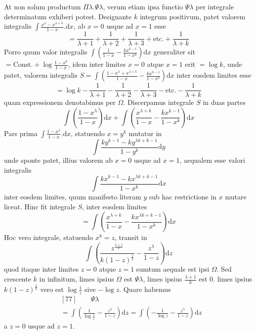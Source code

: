 At non solum productum $\Pi\lambda.\Psi\lambda$, verum etiam ipsa functio $\Psi\lambda$ per integrale determinatum exhiberi potest. Designante $k$ integrum positivum, patet valorem integralis $\int\frac{x^\lambda-x^{\lambda+k}}{1-x}.\mathrm{d}x$, ab $x=0$ usque ad $x=1$ esse
\[
=\frac{1}{\lambda+1}+\frac{1}{\lambda+2}+\frac{1}{\lambda+3}+\text{etc.}+\frac{1}{\lambda+k}
\]
Porro quum valor integralis $\int\left(\frac{1}{1-x}-\frac{kx^{k-1}}{1-x^k}\right)\mathrm{d}x$ generaliter sit $=\mathrm{Const.}+\log\frac{1-x^k}{1-x}$, idem inter limites $x=0$ atque $x=1$ erit $=\log k$, unde patet, valorem integralis $S=\int\left(\frac{1-x^\lambda+x^{\lambda+k}}{1-x}-\frac{kx^{k-1}}{1-x^k}\right)\mathrm{d}x$ inter eosdem limites esse
\[
=\log k-\frac{1}{\lambda+1}-\frac{1}{\lambda+2}-\frac{1}{\lambda+3}-\text{etc.}-\frac{1}{\lambda+k}
\]
quam expressionem denotabimus per $\Omega$. Discerpamus integrale $S$ in duas partes
\[
\int\left(\frac{1-x^\lambda}{1-x}\right)\mathrm{d}x+\int\left(\frac{x^{\lambda+k}}{1-x}-\frac{kx^{k-1}}{1-x^k}\right)\mathrm{d}x
\]
Pars prima $\int\frac{1-x^\lambda}{1-x}.\mathrm{d}x$, statuendo $x=y^k$ mutatur in
\[
\int\frac{ky^{k-1}-ky^{\lambda k+k-1}}{1-y^k}\mathrm{d}y
\]
unde sponte patet, illius valorem ab $x=0$ usque ad $x=1$, aequalem esse valori integralis
\[
\int\frac{kx^{k-1}-kx^{\lambda k+k-1}}{1-x^k}\mathrm{d}x
\]
inter eosdem limites, quum manifesto literam $y$ sub hac restrictione in $x$ mutare liceat. Hinc fit integrale $S$, inter eosdem limites
\[
=\int\left(\frac{x^{\lambda+k}}{1-x}-\frac{kx^{\lambda k+k-1}}{1-x^k}\right)\mathrm{d}x
\]
Hoc vero integrale, statuendo $x^k=z$, transit in
\[
\int\left(\frac{z^{\frac{\lambda+1}{k}}}{k(1-z)^{\frac{1}{k}}}-\frac{z^\lambda}{1-z}\right)\mathrm{d}z
\]
quod itaque inter limites $z=0$ atque $z=1$ sumtum aequale est ipsi $\Omega$. Sed crescente $k$ in infinitum, limes ipsius $\Omega$ est $\Psi\lambda$, limes ipsius $\frac{\lambda+1}{k}$ est $0$. limes ipsius $k(1-z)^{\frac{1}{k}}$ vero est $\log\frac{1}{z}$ sive $-\log z$. Quare habemus
\[
\begin{aligned}
&[77]\qquad \Psi\lambda\\[4pt]
&=\int\left(\frac{1}{\log\frac{1}{z}}-\frac{z^\lambda}{1-z}\right)\mathrm{d}z
=\int\left(-\frac{1}{\log z}-\frac{z^\lambda}{1-z}\right)\mathrm{d}z
\end{aligned}
\]
a $z=0$ usque ad $z=1$.

